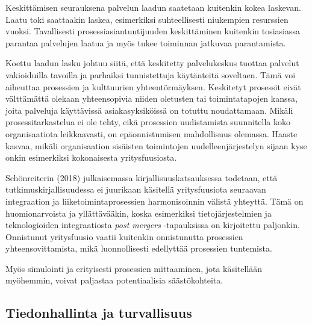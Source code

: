 \documentclass[
  finnish,
  letterpaper,
  DIV=11,
  numbers=noendperiod,
  oneside]{scrreprt}
\begin{document}
Keskittämisen seurauksena palvelun laadun saatetaan kuitenkin kokea
laskevan. Laatu toki saattaakin laskea, esimerkiksi suhteellisesti
niukempien resurssien vuoksi. Tavallisesti prosessiasiantuntijuuden
keskittäminen kuitenkin tosiasiassa parantaa palvelujen laatua ja myös
tukee toiminnan jatkuvaa parantamista.

Koettu laadun lasku johtuu siitä, että keskitetty palvelukeskus tuottaa
palvelut vakioiduilla tavoilla ja parhaiksi tunnistettuja käytänteitä
soveltaen. Tämä voi aiheuttaa prosessien ja kulttuurien
yhteentörmäyksen. Keskitetyt prosessit eivät välttämättä olekaan
yhteensopivia niiden oletusten tai toimintatapojen kanssa, joita
palveluja käyttävissä asiakasyksiköissä on totuttu noudattamaan. Mikäli
prosessitarkastelua ei ole tehty, eikä prosessien uudistamista
suunnitella koko organisaatiota leikkaavasti, on epäonnistumisen
mahdollisuus olemassa. Haaste kasvaa, mikäli organisaation sisäisten
toimintojen uudelleenjärjestelyn sijaan kyse onkin esimerkiksi
kokonaisesta yritysfuusiosta.

Schönreiterin (2018) julkaisemassa kirjallisuuskatsauksessa todetaan,
että tutkimuskirjallisuudessa ei juurikaan käsitellä yritysfuusiota
seuraavan integraation ja liiketoimintaprosessien harmonisoinnin välistä
yhteyttä. Tämä on huomionarvoista ja yllättävääkin, koska esimerkiksi
tietojärjestelmien ja teknologioiden integraatiosta \emph{post mergers}
-tapauksissa on kirjoitettu paljonkin. Onnistunut yritysfuusio vaatii
kuitenkin onnistunutta prosessien yhteensovittamista, mikä
luonnollisesti edellyttää prosessien tuntemista.

Myös simulointi ja erityisesti prosessien mittaaminen, jota käsitellään
myöhemmin, voivat paljastaa potentiaalisia säästökohteita.

\subsection{Tiedonhallinta ja
turvallisuus}\label{tiedonhallinta-ja-turvallisuus}
\end{document}
